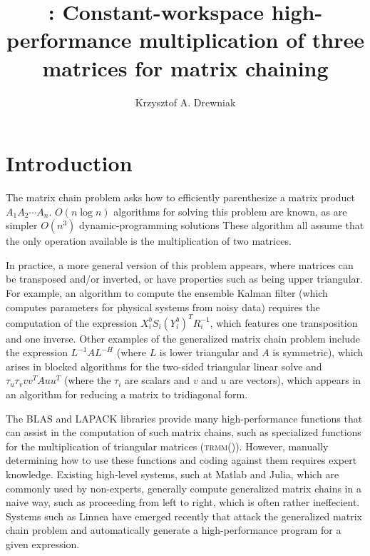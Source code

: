\documentclass[12pt]{article}
\title{\gemmt{}: Constant-workspace high-performance multiplication of three matrices for matrix chaining}
\author{Krzysztof A. Drewniak}
\begin{document}
\maketitle{}
\section{Introduction}
The matrix chain problem asks how to efficiently parenthesize a matrix product $A_1A_2\cdots A_n$.
$O(n \log n)$ algorithms for solving this problem are known\cite{Hu1984}, as are simpler $O(n^3)$ dynamic-programming solutions\cite{Barthels2018}
These algorithm all assume that the only operation available is the multiplication of two matrices.

In practice, a more general version of this problem appears, where matrices can be transposed and/or inverted, or have properties such as being upper triangular\cite{Barthels2018}.
For example, an algorithm to compute the ensemble Kalman filter\cite{Rao2017} (which computes parameters for physical systems from noisy data) requires the computation of the expression $X_i^b S_i (Y_i^b)^T R_i^{-1}$, which features one transposition and one inverse.
Other examples of the generalized matrix chain problem include the expression $L^{-1}AL^{-H}$ (where $L$ is lower triangular and $A$ is symmetric), which arises in blocked algorithms for the two-sided triangular linear solve\cite{Parikh2017} and $\tau_u\tau_v vv^TAuu^T$ (where the $\tau_i$ are scalars and $v$ and $u$ are vectors), which appears in an algorithm for reducing a matrix to tridiagonal form\cite{Choi1995}.

The BLAS and LAPACK libraries provide many high-performance functions that can assist in the computation of such matrix chains, such as specialized functions for the multiplication of triangular matrices (\textsc{trmm}()).
However, manually determining how to use these functions and coding against them requires expert knowledge.
Existing high-level systems, such at Matlab and Julia, which are commonly used by non-experts, generally compute generalized matrix chains in a naive way, such as proceeding from left to right, which is often rather ineffecient.
Systems such as Linnea\cite{Barthels2017} have emerged recently that attack the generalized matrix chain problem and automatically generate a high-performance program for a given expression.
\end{document}
